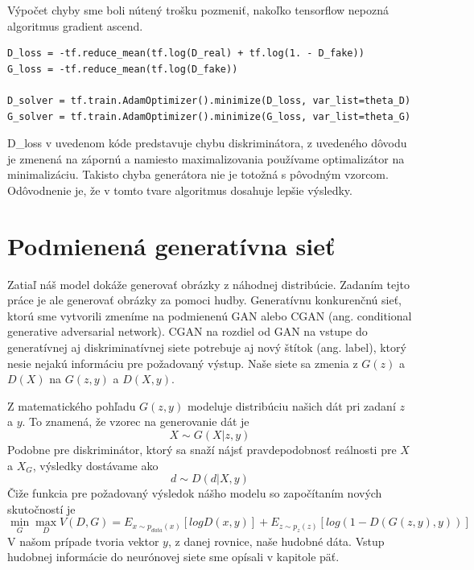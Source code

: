 Výpočet chyby sme boli nútený trošku pozmeniť, nakoľko tensorflow nepozná algoritmus gradient ascend.

\begin{verbatim}
D_loss = -tf.reduce_mean(tf.log(D_real) + tf.log(1. - D_fake))
G_loss = -tf.reduce_mean(tf.log(D_fake))

D_solver = tf.train.AdamOptimizer().minimize(D_loss, var_list=theta_D)
G_solver = tf.train.AdamOptimizer().minimize(G_loss, var_list=theta_G)
\end{verbatim}

D\_loss v uvedenom kóde predstavuje chybu diskriminátora, z uvedeného dôvodu je zmenená na zápornú a namiesto maximalizovania používame optimalizátor na minimalizáciu.
Takisto chyba generátora nie je totožná s pôvodným vzorcom.
Odôvodnenie je, že v tomto tvare algoritmus dosahuje lepšie výsledky.


\section{Podmienená generatívna sieť}
Zatiaľ náš model dokáže generovať obrázky z náhodnej distribúcie.
Zadaním tejto práce je ale generovať obrázky za pomoci hudby.
Generatívnu konkurenčnú sieť, ktorú sme vytvorili zmeníme na podmienenú GAN alebo CGAN (ang. conditional generative adversarial network).
CGAN na rozdiel od GAN na vstupe do generatívnej aj diskriminatívnej siete potrebuje aj nový štítok (ang. label), ktorý nesie nejakú informáciu pre požadovaný výstup.
Naše siete sa zmenia z \(G(z)\) a \(D(X)\) na \(G(z,y)\) a \(D(X,y)\).

Z matematického pohľadu \(G(z,y)\) modeluje distribúciu našich dát pri zadaní \(z\) a \(y\).
To znamená, že vzorec na generovanie dát je 
\[X\sim G(X|z,y)\]
Podobne pre diskriminátor, ktorý sa snaží nájsť pravdepodobnosť reálnosti pre \(X\) a \(X_{G}\), výsledky dostávame ako
\[d\sim D(d|X,y)\]
Čiže funkcia pre požadovaný výsledok nášho modelu so započítaním nových skutočností je
\[\min_{G}\max_{D}V(D,G)=E_{x\sim p_{data}(x)}[logD(x,y)] + E_{z\sim p_{z}(z)}[log(1 - D(G(z,y),y))]\]
V našom prípade tvoria vektor \(y\), z danej rovnice, naše hudobné dáta.
Vstup hudobnej informácie do neurónovej siete sme opísali v kapitole päť.

